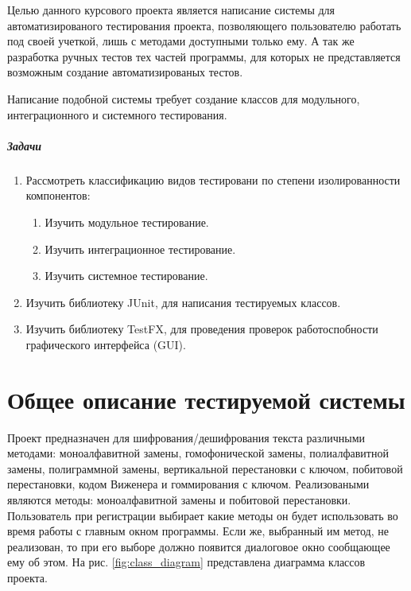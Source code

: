 \documentclass[a4paper,12pt]{article}
\begin{document}
\par Целью данного курсового проекта является  написание системы для автоматизированого тестирования проекта, позволяющего пользователю работать под своей учеткой, лишь с методами доступными только ему. А так же разработка ручных тестов тех частей программы, для которых не представляется возможным создание автоматизированых тестов.
\par Написание подобной системы требует создание классов для модульного, интеграционного и системного тестирования.
\subparagraph{Задачи}
\begin{enumerate}
\item Рассмотреть классификацию видов тестировани по степени изолированности компонентов:
\begin{enumerate}
\item Изучить модульное тестирование.
\item Изучить интеграционное тестирование.
\item Изучить системное тестирование.
\end{enumerate}
\item Изучить библиотеку JUnit, для написания тестируемых классов.
\item Изучить библиотеку TestFX, для проведения проверок работоспобности графического интерфейса (GUI).
\end{enumerate}

\newpage\section{Общее описание тестируемой системы}

Проект предназначен для шифрования/дешифрования текста различными методами: моноалфавитной замены, гомофонической замены, полиалфавитной замены, полиграммной замены, вертикальной перестановки с ключом,  побитовой перестановки, кодом Виженера и гоммирования с ключом. Реализоваными являются методы: моноалфавитной замены и побитовой перестановки.
Пользователь при регистрации выбирает какие методы он будет использовать во время работы с главным окном программы. Если же, выбранный им метод, не реализован, то при его выборе должно появится диалоговое окно сообщающее ему об этом.
На рис. \ref{fig:class_diagram} представлена  диаграмма классов проекта.
\end{document}
